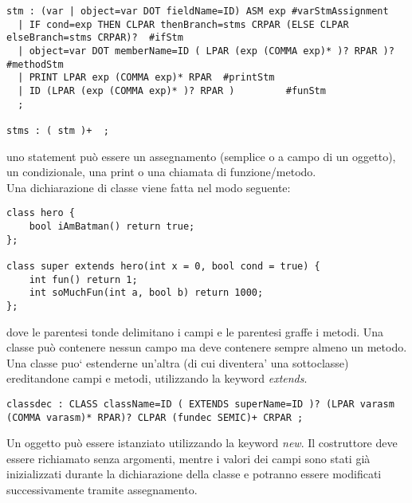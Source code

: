 \documentclass[a4paper]{article}   %
\begin{document}
\begin{lstlisting}
stm : (var | object=var DOT fieldName=ID) ASM exp #varStmAssignment
  | IF cond=exp THEN CLPAR thenBranch=stms CRPAR (ELSE CLPAR elseBranch=stms CRPAR)?  #ifStm
  | object=var DOT memberName=ID ( LPAR (exp (COMMA exp)* )? RPAR )?  #methodStm
  | PRINT LPAR exp (COMMA exp)* RPAR  #printStm
  | ID (LPAR (exp (COMMA exp)* )? RPAR )         #funStm
  ;

stms : ( stm )+  ;

\end{lstlisting}

uno statement può essere un assegnamento (semplice o a campo di un oggetto), un condizionale, una print
o una chiamata di funzione/metodo.\\
\newpage
Una dichiarazione di classe viene fatta nel modo seguente:\\

\begin{lstlisting}
class hero {
    bool iAmBatman() return true;
};

class super extends hero(int x = 0, bool cond = true) {
    int fun() return 1;
    int soMuchFun(int a, bool b) return 1000;
};
\end{lstlisting}

dove le parentesi tonde delimitano i campi e le parentesi graffe i metodi. Una classe può contenere nessun campo
ma deve contenere sempre almeno un metodo. Una classe puo` estenderne un'altra (di cui diventera' una sottoclasse)
ereditandone campi e metodi, utilizzando la keyword \textit{extends}.\\

\begin{lstlisting}
classdec : CLASS className=ID ( EXTENDS superName=ID )? (LPAR varasm (COMMA varasm)* RPAR)? CLPAR (fundec SEMIC)+ CRPAR ;

\end{lstlisting}

Un oggetto può essere istanziato utilizzando la keyword \textit{new}. Il costruttore deve essere richiamato senza argomenti, mentre i valori dei campi
sono stati già inizializzati durante la dichiarazione della classe e potranno essere modificati successivamente
tramite assegnamento.\\
\end{document}
